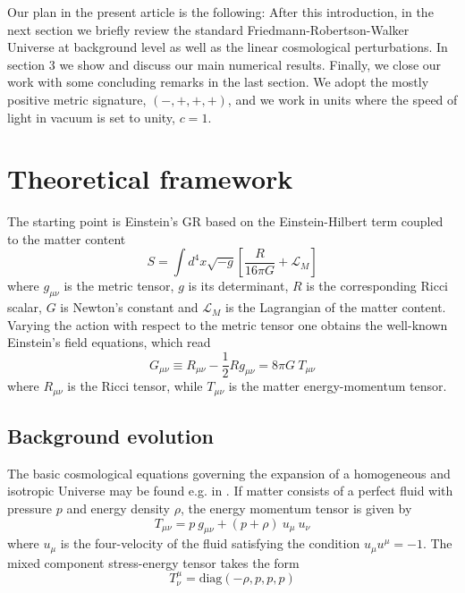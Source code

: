\documentclass[aps,prd,amsmath,amssymb]{revtex4}
\begin{document}
\smallskip

Our plan in the present article is the following: After this introduction, in the next section we briefly review the 
standard Friedmann-Robertson-Walker Universe at background level as well as the linear cosmological perturbations. In section 3 we show and discuss our main numerical results. Finally, we close our work with some concluding remarks in the last section. We adopt the mostly positive metric signature, $(-,+,+,+)$, and we work in units where the speed of light in vacuum is set to unity, $c=1$.



\section{Theoretical framework}

The starting point is Einstein's GR \cite{GR} based on the Einstein-Hilbert term coupled to the matter content
\begin{equation}
S = \int d^4x \sqrt{-g} \left[ \frac{R}{16 \pi G}  + \mathcal{L}_M \right]
\end{equation}
where $g_{\mu \nu}$ is the metric tensor, $g$ is its determinant, $R$ is the corresponding Ricci scalar, $G$ is Newton's constant and $\mathcal{L}_M$ is the Lagrangian of the matter content. Varying the action with respect to the metric tensor
one obtains the well-known Einstein's field equations, which read
\begin{equation}
G_{\mu \nu} \equiv R_{\mu \nu} - \frac{1}{2} R g_{\mu \nu} = 8 \pi G \: T_{\mu \nu}
\end{equation}
where $R_{\mu \nu}$ is the Ricci tensor, while $T_{\mu \nu}$ is the matter energy-momentum tensor.


\subsection{Background evolution}

The basic cosmological equations governing the expansion of a homogeneous and isotropic Universe may be found e.g. in
\cite{review}. If matter consists of a perfect fluid with pressure $p$ and energy density $\rho$, the energy momentum 
tensor is given by
\begin{equation}
T_{\mu \nu} = p \: g_{\mu \nu} + (p + \rho) \: u_\mu \: u_\nu 
\end{equation}
where $u_\mu$ is the four-velocity of the fluid satisfying the condition $u_\mu u^\mu = -1$. The mixed component
stress-energy tensor takes the form \cite{review}
\begin{equation}
T_{\nu}^{\mu} =\textrm{diag}(-\rho,p,p,p)
\end{equation}
\end{document}
